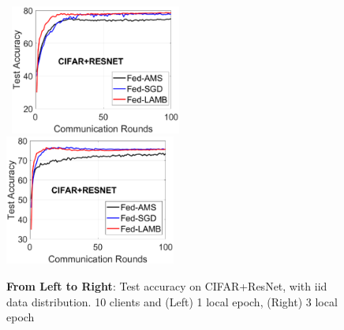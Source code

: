 \documentclass[11pt]{article}
\begin{document}
\begin{figure}[t]
    \begin{center}
        \mbox{
        \includegraphics[width=0.5\textwidth]{figure/cifar_testerror_resnet_ep1_client10_iid1_SGD.eps}
                \includegraphics[width=0.5\textwidth]{figure/cifar_testerror_resnet_ep3_client10_iid1_SGD.eps}
        }
    \end{center}
	\caption{\textbf{From Left to Right}: Test accuracy on CIFAR+ResNet, with iid data distribution. 10 clients and (Left) 1 local epoch, (Right) 3 local epoch}
	\label{fig:cifar-cnn-iid-bis}
\end{figure}
\end{document}
